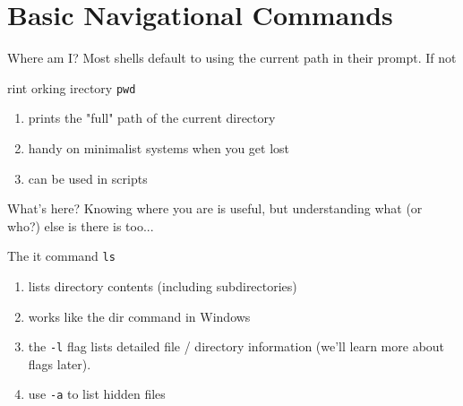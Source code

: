 %
\section{Basic Navigational Commands}
\label{sec:basic_navigational_commands}

\begin{frame}[fragile]{Where am I?}
  Most shells default to using the current path in their prompt.  If not

  \begin{block}{rint orking irectory}
    \texttt{pwd}
    \begin{enumerate}[\--]
      \item prints the "full" path of the current directory
      \item handy on minimalist systems when you get lost
      \item can be used in scripts
    \end{enumerate}
    \vspace*{1em}
  \end{block}
\end{frame}

\begin{frame}[fragile]{What's here?}
  Knowing where you are is useful, but understanding what (or who?) else is there is too...

  \begin{block}{The it command}
    \texttt{ls}
    \begin{enumerate}[\--]
      \item lists directory contents (including subdirectories)
      \item works like the dir command in Windows
      \item the \texttt{-l} flag lists detailed file / directory information (we'll learn more about flags later).
      \item use \texttt{-a} to list hidden files
    \end{enumerate}
    \vspace*{1em}
  \end{block}
\end{frame}

